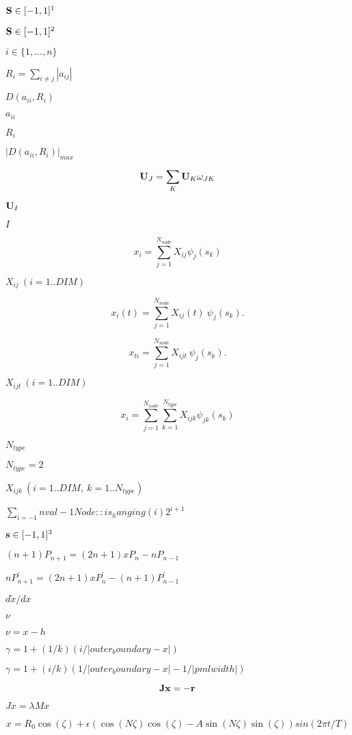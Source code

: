 \documentclass{article}
\begin{document}
$ {\bf S} \in [-1,1]^1 $
\pagebreak

$ {\bf S} \in [-1,1]^2 $
\pagebreak

$ i \in \{ 1,...,n \} $
\pagebreak

$ R_i = \sum_{i\neq j} |a_{ij}| $
\pagebreak

$ D(a_{ii},R_i) $
\pagebreak

$ a_{ii} $
\pagebreak

$ R_i $
\pagebreak

$ |D(a_{ii},R_i)|_{max} $
\pagebreak

\[ {\bf U}_J = \sum_{K} {\bf U}_{K} \omega_{JK} \]
\pagebreak

$ {\bf U}_I $
\pagebreak

$ I $
\pagebreak

\[ x_i = \sum_{j=1}^{N_{node}} X_{ij} \psi_{j}(s_k) \]
\pagebreak

$ X_{ij}\ (i=1..DIM) $
\pagebreak

\[ x_i(t) = \sum_{j=1}^{N_{node}} X_{ij}(t) \ \psi_{j}(s_k). \]
\pagebreak

\[ x_{ti} = \sum_{j=1}^{N_{node}} X_{ijt} \ \psi_{j}(s_k). \]
\pagebreak

$ X_{ijt} \ (i=1..DIM) $
\pagebreak

\[ x_i = \sum_{j=1}^{N_{node}} \sum_{k=1}^{N_{type}} X_{ijk} \psi_{jk}(s_k) \]
\pagebreak

$ N_{type} $
\pagebreak

$ N_{type}=2 $
\pagebreak

$ X_{ijk} \ (i=1..DIM, \ k=1..N_{type}) $
\pagebreak

$ \sum_{i=-1}{nval-1} Node::is_hanging(i) 2^{i+1} $
\pagebreak

$ {\bf s} \in [-1,1]^3 $
\pagebreak

$ (n+1) P_{n+1} = (2n+1)xP_{n} - nP_{n-1} $
\pagebreak

$ nP_{n+1}^{'} = (2n+1)xP_{n}^{'} - (n+1)P_{n-1}^{'} $
\pagebreak

$d\tilde x / d x$
\pagebreak

$\nu$
\pagebreak

$\nu = x - h$
\pagebreak

$\gamma=1 + (1/k)(i/|outer_boundary - x|)$
\pagebreak

$\gamma=1 + (i/k)(1/|outer_boundary - x|-1/|pml width|)$
\pagebreak

\[ {\bf J} {\bf x} = - \bf{r} \]
\pagebreak

$ Jx = \lambda M x$
\pagebreak

\[ x = R_0 \cos(\zeta) + \epsilon \left( \cos(N \zeta) \cos(\zeta) - A \sin(N \zeta) \sin(\zeta) \right) sin(2 \pi t/T) \]
\pagebreak
\end{document}
